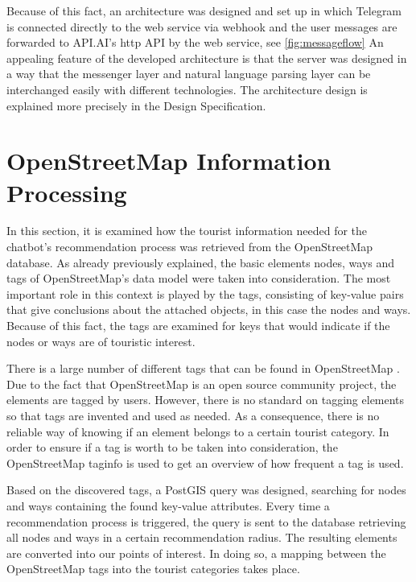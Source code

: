 
Because of this fact, an architecture was designed and set up in which Telegram is connected directly to the web service via webhook and the user messages are forwarded to API.AI’s http API by the web service, see \ref{fig:messageflow} An appealing feature of the developed architecture is that the server was designed in a way that the messenger layer and natural language parsing layer can be interchanged easily with different technologies. The architecture design is explained more precisely in the Design Specification.


\section{OpenStreetMap Information Processing}
In this section, it is examined how the tourist information needed for the chatbot’s recommendation process was retrieved from the OpenStreetMap database. As already previously explained, the basic elements nodes, ways and tags of OpenStreetMap’s data model were taken into consideration. The most important role in this context is played by the tags, consisting of key-value pairs that give conclusions about the attached objects, in this case the nodes and ways. Because of this fact, the tags are examined for keys that would indicate if the nodes or ways are of touristic interest.

There is a large number of different tags that can be found in OpenStreetMap \cite{osm:map_features}. Due to the fact that OpenStreetMap is an open source community project, the elements are tagged by users. However, there is no standard on tagging elements so that tags are invented and used as needed. As a consequence, there is no reliable way of knowing if an element belongs to a certain tourist category. In order to ensure if a tag is worth to be taken into consideration, the OpenStreetMap taginfo \cite{osm:taginfo} is used to get an overview of how frequent a tag is used.

Based on the discovered tags, a PostGIS query was designed, searching for nodes and ways containing the found key-value attributes. Every time a recommendation process is triggered, the query is sent to the database retrieving all nodes and ways in a certain recommendation radius. The resulting elements are converted into our points of interest. In doing so, a mapping between the OpenStreetMap tags into the tourist categories takes place.


